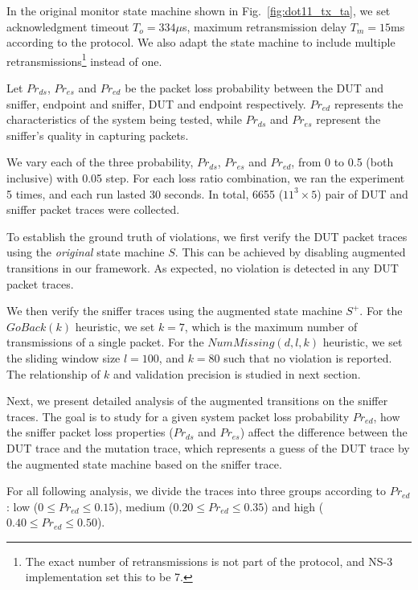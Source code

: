 In the original monitor state machine shown in Fig.~\ref{fig:dot11_tx_ta}, we
set acknowledgment timeout $T_o=334\mu$s, maximum retransmission delay
$T_m=15$ms according to the protocol. We also adapt the state machine to include
multiple retransmissions\footnote{The exact number of retransmissions is not
part of the protocol, and NS-3 implementation set this to be 7.} instead of one.

Let $Pr_{ds}$, $Pr_{es}$ and $Pr_{ed}$ be the packet loss probability between
the DUT and sniffer, endpoint and sniffer, DUT and endpoint respectively.
$Pr_{ed}$ represents the characteristics of the system being tested, while
$Pr_{ds}$ and $Pr_{es}$ represent the sniffer's quality in capturing packets.



We vary each of the three probability, $Pr_{ds}$, $Pr_{es}$ and $Pr_{ed}$, from
0 to 0.5 (both inclusive) with 0.05 step.  For each loss ratio combination, we
ran the experiment 5 times, and each run lasted
30 seconds. In total, 6655 ($11^3\times 5$) pair of DUT and sniffer packet
traces were collected.

To establish the ground truth of violations, we first verify the DUT packet
traces using the \textit{original} state machine $S$.  This can be achieved by
disabling augmented transitions in our framework.  As expected, no violation is
detected in any DUT packet traces.

We then verify the sniffer traces using the augmented state machine $S^+$.  For
the $GoBack(k)$ heuristic, we set $k=7$, which is the maximum number of
transmissions of a single packet. For the $NumMissing(d, l, k)$ heuristic, we
set the sliding window size $l=100$, and $k=80$ such that no violation is
reported. The relationship of $k$ and validation precision is studied in next
section.

Next, we present detailed analysis of the augmented transitions on the sniffer
traces. The goal is to study for a given system packet loss probability
$Pr_{ed}$, how the sniffer packet loss properties ($Pr_{ds}$ and $Pr_{es}$)
affect the difference between the DUT trace and the mutation trace, which represents
a guess of the DUT trace by the augmented state machine based on the sniffer
trace.

For all following analysis, we divide the traces into three groups according to
$Pr_{ed}$: low ($0 \le Pr_{ed} \le 0.15$), medium ($0.20 \le Pr_{ed} \le 0.35$)
and high ($0.40 \le Pr_{ed} \le 0.50$).

